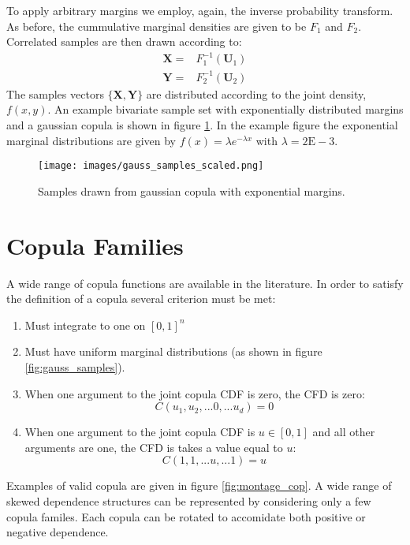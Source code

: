 To apply arbitrary margins we employ, again, the inverse probability transform.  As before, the cummulative marginal densities are given to be $F_1$ and $F_2$.
Correlated samples are then drawn according to:
\begin{eqnarray}
\mathbf X = & F_1^{-1}(\mathbf U_1) \\
\mathbf Y = & F_2^{-1}(\mathbf U_2)
\end{eqnarray}
The samples vectors $\{\mathbf X, \mathbf Y\}$ are distributed according to the joint density, $f(x,y)$.  An example bivariate sample set with exponentially distributed margins and a gaussian copula is shown in figure \ref{fig:gauss_samples_scaled}.  In the example figure the exponential marginal distributions are given by $f(x)=\lambda e^{-\lambda x}$ with $\lambda=2\mathrm{E-}3$.

\begin{figure}[!htbp]
\centering
\texttt{[image: images/gauss\_samples\_scaled.png]}
\caption{Samples drawn from gaussian copula with exponential margins.}
\label{fig:gauss_samples_scaled}
\end{figure}


\section*{Copula Families}

A wide range of copula functions are available in the literature.  In order to satisfy the definition of a copula several criterion must be met:
\begin{enumerate}
\item Must integrate to one on $[0, 1]^n$
\item Must have uniform marginal distributions (as shown in figure \ref{fig:gauss_samples}).
\item When one argument to the joint copula CDF is zero, the CFD is zero:
\begin{equation}
C(u_1, u_2, ... 0, ... u_d) = 0
\end{equation}
\item When one argument to the joint copula CDF is $u\in[0,1]$ and all other arguments are one, the CFD is takes a value equal to $u$:
\begin{equation}
C(1, 1, ... u, ... 1) = u
\end{equation}
\end{enumerate}

Examples of valid copula are given in figure \ref{fig:montage_cop}.  A wide range of skewed dependence structures can be represented by considering only a few copula familes.  Each copula can be rotated to accomidate both positive or negative dependence.

